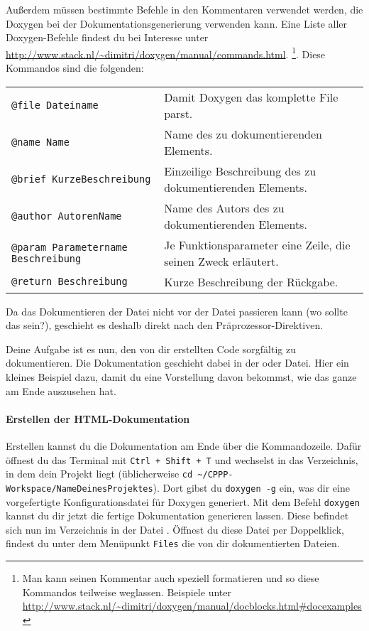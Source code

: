 Außerdem müssen bestimmte Befehle in den Kommentaren verwendet werden, die Doxygen bei der Dokumentationsgenerierung verwenden kann.
Eine Liste aller Doxygen-Befehle findest du bei Interesse unter \url{http://www.stack.nl/~dimitri/doxygen/manual/commands.html}.
\footnote{Man kann seinen Kommentar auch speziell formatieren und so diese Kommandos teilweise weglassen.
Beispiele unter \url{http://www.stack.nl/~dimitri/doxygen/manual/docblocks.html\#docexamples}}.
Diese Kommandos sind die folgenden:

\medskip
    \begin{tabular}{ll}
        {\lstinline!@file Dateiname!} & Damit Doxygen das komplette File parst. \\
        {\lstinline!@name Name!} & Name des zu dokumentierenden Elements. \\
        {\lstinline!@brief KurzeBeschreibung!} & Einzeilige Beschreibung des zu dokumentierenden Elements. \\
        {\lstinline!@author AutorenName!} & Name des Autors des zu dokumentierenden Elements. \\
        {\lstinline!@param Parametername Beschreibung!} & Je Funktionsparameter eine Zeile, die seinen Zweck erläutert. \\
        {\lstinline!@return Beschreibung!} & Kurze Beschreibung der Rückgabe. \\
    \end{tabular}
\medskip

Da das Dokumentieren der Datei nicht vor der Datei passieren kann (wo sollte das sein?), geschieht es deshalb direkt nach den Präprozessor-Direktiven.

Deine Aufgabe ist es nun, den von dir erstellten Code sorgfältig zu dokumentieren.
Die Dokumentation geschieht dabei in der  oder  Datei. 
Hier ein kleines Beispiel dazu, damit du eine Vorstellung davon bekommst, wie das ganze am Ende auszusehen hat.


\paragraph{Erstellen der HTML-Dokumentation}
Erstellen kannst du die Dokumentation am Ende über die Kommandozeile.
Dafür öffnest du das Terminal mit \lstinline{Ctrl + Shift + T} und wechselst in das Verzeichnis, in dem dein Projekt liegt (üblicherweise \lstinline{cd ~/CPPP-Workspace/NameDeinesProjektes}).
Dort gibst du \lstinline{doxygen -g} ein, was dir eine vorgefertigte Konfigurationsdatei für Doxygen generiert. 
Mit dem Befehl \lstinline{doxygen} kannst du dir jetzt die fertige Dokumentation generieren lassen.
Diese befindet sich nun im Verzeichnis  in der Datei .
Öffnest du diese Datei per Doppelklick, findest du unter dem Menüpunkt \lstinline{Files} die von dir dokumentierten Dateien.

